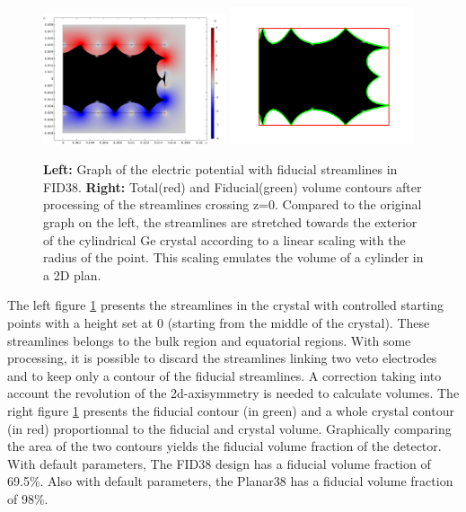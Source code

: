 \begin{figure}
\centering
\includegraphics[width=0.48\textwidth]{Figures/Electrodes/fid38_fiducial_streamlines.png}
\includegraphics[width=0.48\textwidth]{Figures/Electrodes/fid38_fiducial_contour.png}
\caption{
\textbf{Left:} Graph of the electric potential with fiducial streamlines in FID38.
\textbf{Right:} Total(red) and Fiducial(green) volume contours after processing of the streamlines crossing z=0. Compared to the original graph on the left, the streamlines are stretched towards the exterior of the cylindrical Ge crystal according to a linear scaling with the radius of the point. This scaling emulates the volume of a cylinder in a 2D plan.
}
\label{fig:fid38-fiducial}
\end{figure}

The left figure \ref{fig:fid38-fiducial} presents the streamlines in the crystal with controlled starting points with a height set at 0 (starting from the middle of the crystal). These streamlines belongs to the bulk region and equatorial regions. With some processing, it is possible to discard the streamlines linking two veto electrodes and to keep only a contour of the fiducial streamlines. A correction taking into account the revolution of the 2d-axisymmetry is needed to calculate volumes. The right figure \ref{fig:fid38-fiducial} presents the fiducial contour (in green) and a whole crystal contour (in red) proportionnal to the fiducial and crystal volume. Graphically comparing the area of the two contours yields the fiducial volume fraction of the detector. With default parameters, The FID38 design has a fiducial volume fraction of 69.5\%. Also with default parameters, the Planar38 has a fiducial volume fraction of 98\%.


